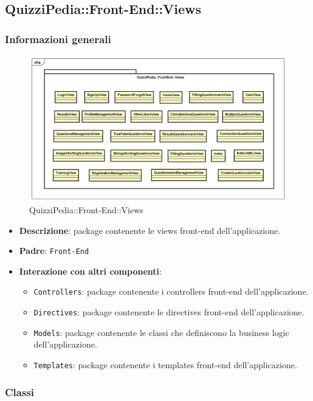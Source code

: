 \newpage

\subsection{QuizziPedia::Front-End::Views}
\subsubsection{Informazioni generali}
\label{QuizziPedia::Front-End}
\begin{figure}
	\centering
	\includegraphics[scale=0.45]{UML/Package/QuizziPedia_Front-End_View.png}
	\caption{QuizziPedia::Front-End::Views}
\end{figure}
\begin{itemize}
	\item \textbf{Descrizione}: package contenente le views front-end dell'applicazione.
	\item \textbf{Padre}: \texttt{Front-End}
	\item \textbf{Interazione con altri componenti}:
	\begin{itemize}
		\item \texttt{Controllers}: package contenente i controllers front-end dell'applicazione.
		\item \texttt{Directives}: package contenente le directives front-end dell'applicazione.
		\item \texttt{Models}: package contenente le classi che definiscono la business logic dell'applicazione.
		\item \texttt{Templates}: package contenente i templates front-end dell'applicazione.
	\end{itemize}
\end{itemize}
\subsubsection{Classi}

